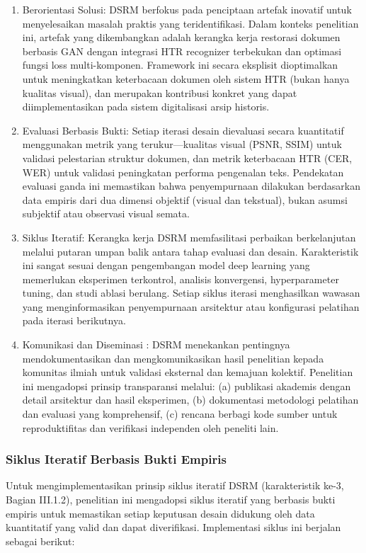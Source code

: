 \documentclass[12pt,a4paper]{article}
\begin{document}
\begin{enumerate}[label=\arabic*., leftmargin=*, nosep]
\item Berorientasi Solusi: DSRM berfokus pada penciptaan artefak inovatif untuk menyelesaikan masalah praktis yang teridentifikasi. Dalam konteks penelitian ini, artefak yang dikembangkan adalah kerangka kerja restorasi dokumen berbasis GAN dengan integrasi HTR recognizer terbekukan dan optimasi fungsi loss multi-komponen. Framework ini secara eksplisit dioptimalkan untuk meningkatkan keterbacaan dokumen oleh sistem HTR (bukan hanya kualitas visual), dan merupakan kontribusi konkret yang dapat diimplementasikan pada sistem digitalisasi arsip historis.

\item Evaluasi Berbasis Bukti: Setiap iterasi desain dievaluasi secara kuantitatif menggunakan metrik yang terukur---kualitas visual (PSNR, SSIM) untuk validasi pelestarian struktur dokumen, dan metrik keterbacaan HTR (CER, WER) untuk validasi peningkatan performa pengenalan teks. Pendekatan evaluasi ganda ini memastikan bahwa penyempurnaan dilakukan berdasarkan data empiris dari dua dimensi objektif (visual dan tekstual), bukan asumsi subjektif atau observasi visual semata.

\item Siklus Iteratif: Kerangka kerja DSRM memfasilitasi perbaikan berkelanjutan melalui putaran umpan balik antara tahap evaluasi dan desain. Karakteristik ini sangat sesuai dengan pengembangan model deep learning yang memerlukan eksperimen terkontrol, analisis konvergensi, hyperparameter tuning, dan studi ablasi berulang. Setiap siklus iterasi menghasilkan wawasan yang menginformasikan penyempurnaan arsitektur atau konfigurasi pelatihan pada iterasi berikutnya.

\item Komunikasi dan Diseminasi : DSRM menekankan pentingnya mendokumentasikan dan mengkomunikasikan hasil penelitian kepada komunitas ilmiah untuk validasi eksternal dan kemajuan kolektif. Penelitian ini mengadopsi prinsip transparansi melalui: (a) publikasi akademis dengan detail arsitektur dan hasil eksperimen, (b) dokumentasi metodologi pelatihan dan evaluasi yang komprehensif, (c) rencana berbagi kode sumber untuk reproduktifitas dan verifikasi independen oleh peneliti lain.
\end{enumerate}

\subsubsection{Siklus Iteratif Berbasis Bukti Empiris}
Untuk mengimplementasikan prinsip siklus iteratif DSRM (karakteristik ke-3, Bagian III.1.2), penelitian ini mengadopsi siklus iteratif yang berbasis bukti empiris untuk memastikan setiap keputusan desain didukung oleh data kuantitatif yang valid dan dapat diverifikasi. Implementasi siklus ini berjalan sebagai berikut:
\end{document}
